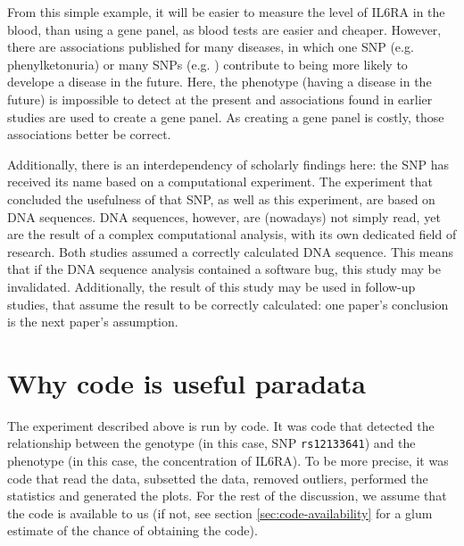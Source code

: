 From this simple example, it will be easier
to measure the level of IL6RA in the blood, than using a gene panel,
as blood tests are easier and cheaper.
However, there are associations published for many diseases,
in which one SNP (e.g. phenylketonuria) or many SNPs (e.g. \cite{bruce2009metabolic}) 
contribute to being more likely to develope a disease in the future. 
Here, the phenotype (having a disease in the future) 
is impossible to detect at the present
and associations found in earlier studies are used to create a gene panel.
As creating a gene panel is costly, those associations better be correct.

Additionally, there is an interdependency of scholarly findings here:
the SNP has received its name based on a computational experiment.
The experiment that concluded the usefulness of that SNP, 
as well as this experiment, are based on DNA sequences.
DNA sequences, however, are (nowadays) not simply read, 
yet are the result of a complex computational analysis,
with its own dedicated field of research.
Both studies assumed a correctly calculated DNA sequence.
This means that if the DNA sequence analysis contained a software bug, 
this study may be invalidated. 
Additionally, the result of this study may be used in follow-up studies,
that assume the result to be correctly calculated: one paper's conclusion
is the next paper's assumption.

\section{Why code is useful paradata}


The experiment described above is run by code. 
It was code that detected the relationship between the genotype
(in this case, SNP \verb|rs12133641|) 
and the phenotype (in this case, the concentration of IL6RA).
To be more precise, it was code that read the data,
subsetted the data, removed outliers, 
performed the statistics and generated the plots.
For the rest of the discussion, we assume that the
code is available to us (if not, see section \ref{sec:code-availability} 
for a glum estimate of the chance of obtaining the code).

